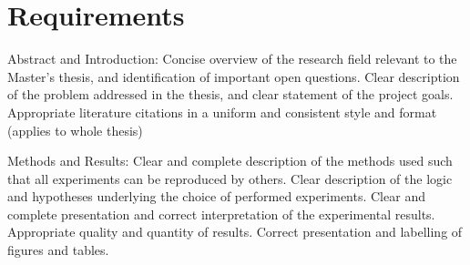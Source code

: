 \section{Requirements}
Abstract and Introduction: Concise overview of the research field relevant to the Master’s thesis, and identification of important open questions. Clear description of the problem addressed in the thesis, and clear statement of the project goals. Appropriate literature citations in a uniform and consistent style and format (applies to whole thesis)

Methods and Results: Clear and complete description of the methods used such that all experiments can be reproduced by others. Clear description of the logic and hypotheses underlying the choice of performed experiments. Clear and complete presentation and correct interpretation of the experimental results. Appropriate quality and quantity of results. Correct presentation and labelling of figures and tables.

